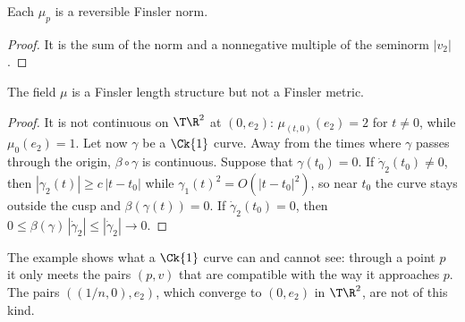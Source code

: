 \begin{proposition}
  \label{prop:mt-cusp-fibers}
  \leanok
  Each $\mu_p$ is a reversible Finsler norm.
\end{proposition}

\begin{proof}
  \leanok
  It is the sum of the norm and a nonnegative multiple of the seminorm $|v_2|$.
\end{proof}

\begin{theorem}
  \label{thm:mt-cusp}
  \leanok
  The field $\mu$ is a Finsler length structure but not a Finsler metric.
\end{theorem}

\begin{proof}
  \leanok
  It is not continuous on $\T\R^2$ at $(0, e_2)$: $\mu_{(t,0)}(e_2) = 2$ for $t \neq 0$, while
  $\mu_0(e_2) = 1$. Let now $\gamma$ be a $\Ck{1}$ curve. Away from the times where $\gamma$ passes
  through the origin, $\beta \circ \gamma$ is continuous. Suppose that $\gamma(t_0) = 0$. If
  $\dot\gamma_2(t_0) \neq 0$, then $|\gamma_2(t)| \ge c\,|t - t_0|$ while $\gamma_1(t)^2 =
  O(|t-t_0|^2)$, so near $t_0$ the curve stays outside the cusp and $\beta(\gamma(t)) = 0$. If
  $\dot\gamma_2(t_0) = 0$, then $0 \le \beta(\gamma)\,|\dot\gamma_2| \le |\dot\gamma_2| \to 0$.
\end{proof}

The example shows what a $\Ck{1}$ curve can and cannot see: through a point $p$ it only meets the
pairs $(p, v)$ that are compatible with the way it approaches $p$. The pairs $((1/n, 0), e_2)$,
which converge to $(0, e_2)$ in $\T\R^2$, are not of this kind.
